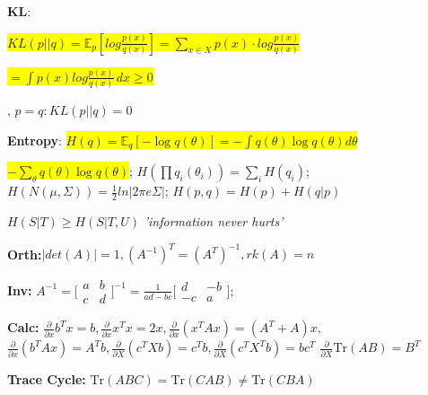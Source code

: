 \documentclass[11pt,landscape,a4paper,fleqn]{article}
\newcommand{\mhl}[1]{\setlength{\fboxsep}{0pt}\colorbox{yellow}{#1}}
\begin{document}
\begin{multicols*}{4}

\textbf{KL}: {\fontsize{10.5}{6}\selectfont \mhl{$KL(p||q) = \mathbb{E}_p[log\frac{p(x)}{q(x)}] = \sum_{x \in X} p(x) \cdot log \frac{p(x)}{q(x)}$}
	
\mhl{$= \int p(x) log \frac{p(x)}{q(x)} \, dx \geq 0$}}, $p=q: KL(p||q) = 0$


\textbf{Entropy}: \mhl{{\fontsize{9.5}{6}\selectfont $H(q) = \mathbb{E}_q[-\log q(\theta)] = - \int q(\theta)\log q(\theta) d\theta $}}

\mhl{{\fontsize{9.3}{6}\selectfont $- \sum_\theta q(\theta) \log q(\theta)$}};
$H(\prod q_i(\theta_i)) = \sum_i H(q_i)$; $H(N(\mu, \Sigma)) = \frac{1}{2}  ln|2\pi e \Sigma|$;
$H(p,q) = H(p) + H(q | p)$

$H(S | T) \geq H(S | T, U)$ \textit{'information never hurts'}

\textbf{Orth:}$|det(A)|=1, (A^{-1})^T=(A^T)^{-1}, rk(A)=n$

\textbf{Inv:} $A^{-1}=
\big[
\begin{smallmatrix}
a&b \\ 
c&d
\end{smallmatrix}\big]^{-1}=
\frac{1}{ad-bc}
\big[
\begin{smallmatrix}
d&-b \\ 
-c&a
\end{smallmatrix}\big];
$

\textbf{Calc:}
$\frac{\partial}{\partial x}b^Tx=b,\!
\frac{\partial}{\partial x}x^Tx=2x,\!
\frac{\partial}{\partial x}(x^TAx)=(A^T+A)x,$
$\frac{\partial}{\partial x}(b^TAx)=A^Tb, \frac{\partial}{\partial X}(c^TXb)=c^Tb,
\frac{\partial}{\partial X}(c^TX^Tb)=bc^T$
$\frac{\partial}{\partial X}\text{Tr}(AB)=B^T$

\textbf{Trace Cycle:} $\text{Tr}(ABC)=\text{Tr}(CAB)\neq \text{Tr}(CBA)$

\iffalse
\textbf{Eigdec:}
$A,Q \in \mathbb{R}^{n\times n}, A=Q\Lambda Q^{-1},\! \Lambda = diag(\lambda_i)$\\
$Q=[v_1,..,v_n], \text{(col's are e-vec.)}$

if all $\lambda_i\geq0: A^{-1}=Q\Lambda^{-1}Q^{-1},\Lambda^{-1}=diag(\frac{1}{\lambda_i})$\\
if $A=A^T\text{(symm.) and }x^TAx\geq0 \forall x \neq 0 \rightarrow psd$

\textbf{SVD:}
$X\in \mathbb{R}^{n\times p}, U\in \mathbb{R}^{n\times n}, S\in \mathbb{R}^{n\times p},
V\in \mathbb{R}^{p\times p}$\\
$X=USV^T=\sum_{k=1}^{rank(X)}\sigma_{k,k}u_k (v_k)^T,\!${\tiny{($U^TU=V^TV=I$)}}\\
$X^TX=VS^TU^TUSV^T=VS^TSV^T=V\Sigma V^T$\\
$\Sigma = diag(\sigma_1^2,..,\sigma_n^2);\sigma_i^2=\lambda_i; \forall \lambda_i \geq 0$
\fi




\end{multicols*}
\end{document}
